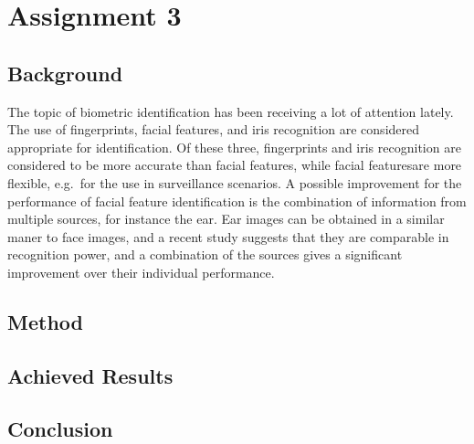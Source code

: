 \documentclass{article}
\begin{document}
\subsection{}
\subsection{}

\section{Assignment 3}
\subsection{Background}
The topic of biometric identification has been receiving a lot of attention lately. %
The use of fingerprints, facial features, and iris recognition are considered appropriate for identification.
Of these three, fingerprints and iris recognition are considered to be more accurate than facial features,
while facial featuresare more flexible, e.g.\ for the use in surveillance scenarios.
A possible improvement for the performance of facial feature identification is the combination of information from multiple sources,
for instance the ear.
Ear images can be obtained in a similar maner to face images, 
and a recent study suggests that they are comparable in recognition power\cite{chang2003comparison},
and a combination of the sources gives a significant improvement over their individual performance.
\subsection{Method}
\subsection{Achieved Results}
\subsection{Conclusion}



\end{document}
